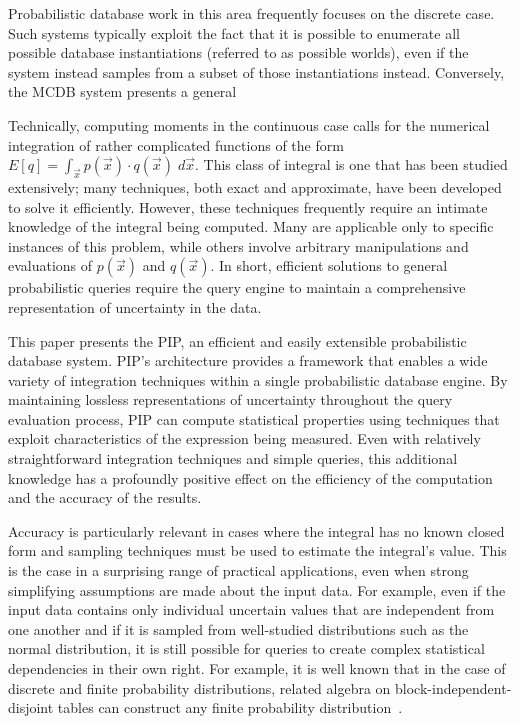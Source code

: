 Probabilistic database work in this area frequently focuses on the discrete case.  Such systems typically exploit the fact that it is possible to enumerate all possible database instantiations (referred to as possible worlds), even if the system instead samples from a subset of those instantiations instead.  Conversely, the MCDB \cite{MCDB} system presents a general 


Technically, computing moments in the continuous case calls for the numerical integration of rather complicated functions of the form $E[q] = \int_{\vec x} p(\vec{x}) \cdot q(\vec{x}) \; d\vec{x}.$
This class of integral is one that has been studied extensively; many techniques, both exact and approximate, have been developed to solve it efficiently.  However, these techniques frequently require an intimate knowledge of the integral being computed.  Many are applicable only to specific instances of this problem, while others involve arbitrary manipulations and evaluations of $p(\vec x)$ and $q(\vec x)$.  In short, efficient solutions to general probabilistic queries require the query engine to maintain a comprehensive representation of uncertainty in the data.

This paper presents the PIP, an efficient and easily extensible probabilistic database system.  PIP's architecture provides a framework that enables a wide variety of integration techniques within a single probabilistic database engine.  By maintaining lossless representations of uncertainty throughout the query evaluation process, PIP can compute statistical properties using techniques that exploit characteristics of the expression being measured.  Even with relatively straightforward integration techniques and simple queries, this additional knowledge has a profoundly positive effect on the efficiency of the computation and the accuracy of the results.

Accuracy is particularly relevant in cases where the integral has no known closed form and sampling techniques must be used to estimate the integral's value.  This is the case in a surprising range of practical applications, even when strong simplifying assumptions are made about the input data.  For example, even if the input data contains only individual uncertain values that are independent from one another and if it is sampled from well-studied distributions such as the normal distribution, it is still possible for queries to create complex statistical dependencies in their own right.  For example, it is well known that in the case of discrete and finite probability distributions, related algebra on block-independent-disjoint tables can construct any finite probability distribution\ \cite{1325861,IL1984}.

